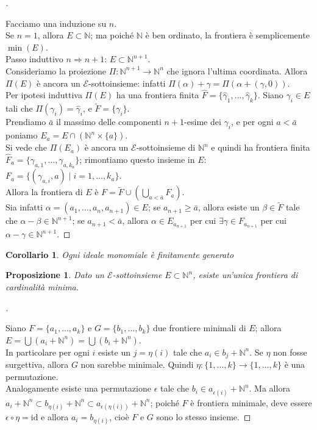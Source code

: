 \documentclass[a4paper,10pt]{article}
\theoremstyle{plain}
\newtheorem{prop}[thm]{Proposizione}
\newtheorem*{cor}{Corollario}
\theoremstyle{definition}
\newenvironment{myproof}[1][\proofname]{%
  \begin{proof}[#1]$ $\par\nobreak\ignorespaces
}{%
  \qedhere
  \end{proof}
}
\newcommand{\N}{\mathbb{N}}
\begin{document}
\begin{myproof}
    Facciamo una induzione su $n$.\\
    Se $n=1$, allora $E\subset\N$; ma poiché $\N$ è ben ordinato, la frontiera è semplicemente $\min(E)$.\\
    Passo induttivo $n\Rightarrow n+1$: $E\subset\N^{n+1}$.\\
    Consideriamo la proiezione $\Pi:\N^{n+1}\to\N^n$ che ignora l'ultima coordinata. Allora $\Pi(E)$ è ancora un $\mathcal E$-sottoinsieme: infatti $\Pi(\alpha)+\gamma=\Pi(\alpha+(\gamma,0))$.\\
    Per ipotesi induttiva $\Pi(E)$ ha una frontiera finita $\hat F=\{ \hat\gamma_1,\dots,\hat\gamma_k \}$. Siano $\gamma_i\in E$ tali che $\Pi(\gamma_i)=\hat\gamma_i$, e $\tilde F=\{ \gamma_i \}$.\\
    Prendiamo $\bar a$ il massimo delle componenti $n+1$-esime dei $\gamma_i$, e per ogni $a<\bar a$ poniamo $E_a=E\cap\left( \N^n\times\{a\} \right)$.\\
    Si vede che $\Pi(E_a)$ è ancora un $\mathcal E$-sottoinsieme di $\N^n$ e quindi ha frontiera finita $\hat F_a=\{ \gamma_{a,1},\dots,\gamma_{a,k_a} \}$; rimontiamo questo insieme in $E$: $F_a=\{ (\gamma_{a,i},a) \mid i=1,\dots,k_a \}$.\\
    Allora la frontiera di $E$ è $F=\tilde F\cup\left( \bigcup_{a<\bar a}F_a \right)$.\\
    Sia infatti $\alpha=(a_1,\dots,a_n,a_{n+1})\in E$; se $a_{n+1}\ge\bar a$, allora esiste un $\beta\in\tilde F$ tale che $\alpha-\beta\in\N^{n+1}$; se $a_{n+1}<\bar a$, allora $\alpha\in E_{a_{n+1}}$ per cui $\exists\gamma\in F_{a_{n+1}}$ per cui $\alpha-\gamma\in\N^{n+1}$.
\end{myproof}
\begin{cor}
    Ogni ideale monomiale è finitamente generato
\end{cor}

\begin{prop}
    Dato un $\mathcal E$-sottoinsieme $E\subset\N^n$, esiste un'unica frontiera di cardinalità minima.
\end{prop}
\begin{myproof}
    Siano $F=\{ a_1,\dots,a_k \}$ e $G=\{ b_1,\dots,b_k \}$ due frontiere minimali di $E$; allora $E=\bigcup(a_i+\N^n)=\bigcup(b_i+\N^n)$.\\
    In particolare per ogni $i$ esiste un $j=\eta(i)$ tale che $a_i\in b_j+\N^n$. Se $\eta$ non fosse surgettiva, allora $G$ non sarebbe minimale. Quindi $\eta:\{1,\dots,k\}\to\{1,\dots,k\}$ è una permutazione.\\
    Analogamente esiste una permutazione $\epsilon$ tale che $b_i\in a_{\epsilon(i)}+\N^n$. Ma allora $a_i+\N^n\subset b_{\eta(i)}+\N^n\subset a_{\epsilon(\eta(i))}+\N^n$; poiché $F$ è frontiera minimale, deve essere $\epsilon\circ\eta=\text{id}$ e allora $a_i=b_{\eta(i)}$, cioè $F$ e $G$ sono lo stesso insieme.
\end{myproof}
\end{document}
